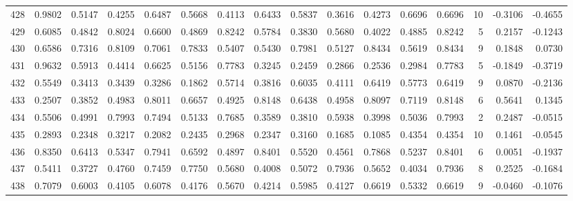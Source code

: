 \begin{tabular}{lrrrrrrrrrrrrrrr}
428 &      0.9802 &  0.5147 &  0.4255 &  0.6487 &  0.5668 &  0.4113 &  0.6433 &  0.5837 &  0.3616 &  0.4273 &   0.6696 &     0.6696 &     10 &                   -0.3106 &                    -0.4655 \\
429 &      0.6085 &  0.4842 &  0.8024 &  0.6600 &  0.4869 &  0.8242 &  0.5784 &  0.3830 &  0.5680 &  0.4022 &   0.4885 &     0.8242 &      5 &                    0.2157 &                    -0.1243 \\
430 &      0.6586 &  0.7316 &  0.8109 &  0.7061 &  0.7833 &  0.5407 &  0.5430 &  0.7981 &  0.5127 &  0.8434 &   0.5619 &     0.8434 &      9 &                    0.1848 &                     0.0730 \\
431 &      0.9632 &  0.5913 &  0.4414 &  0.6625 &  0.5156 &  0.7783 &  0.3245 &  0.2459 &  0.2866 &  0.2536 &   0.2984 &     0.7783 &      5 &                   -0.1849 &                    -0.3719 \\
432 &      0.5549 &  0.3413 &  0.3439 &  0.3286 &  0.1862 &  0.5714 &  0.3816 &  0.6035 &  0.4111 &  0.6419 &   0.5773 &     0.6419 &      9 &                    0.0870 &                    -0.2136 \\
433 &      0.2507 &  0.3852 &  0.4983 &  0.8011 &  0.6657 &  0.4925 &  0.8148 &  0.6438 &  0.4958 &  0.8097 &   0.7119 &     0.8148 &      6 &                    0.5641 &                     0.1345 \\
434 &      0.5506 &  0.4991 &  0.7993 &  0.7494 &  0.5133 &  0.7685 &  0.3589 &  0.3810 &  0.5938 &  0.3998 &   0.5036 &     0.7993 &      2 &                    0.2487 &                    -0.0515 \\
435 &      0.2893 &  0.2348 &  0.3217 &  0.2082 &  0.2435 &  0.2968 &  0.2347 &  0.3160 &  0.1685 &  0.1085 &   0.4354 &     0.4354 &     10 &                    0.1461 &                    -0.0545 \\
436 &      0.8350 &  0.6413 &  0.5347 &  0.7941 &  0.6592 &  0.4897 &  0.8401 &  0.5520 &  0.4561 &  0.7868 &   0.5237 &     0.8401 &      6 &                    0.0051 &                    -0.1937 \\
437 &      0.5411 &  0.3727 &  0.4760 &  0.7459 &  0.7750 &  0.5680 &  0.4008 &  0.5072 &  0.7936 &  0.5652 &   0.4034 &     0.7936 &      8 &                    0.2525 &                    -0.1684 \\
438 &      0.7079 &  0.6003 &  0.4105 &  0.6078 &  0.4176 &  0.5670 &  0.4214 &  0.5985 &  0.4127 &  0.6619 &   0.5332 &     0.6619 &      9 &                   -0.0460 &                    -0.1076 \\

\end{tabular}
